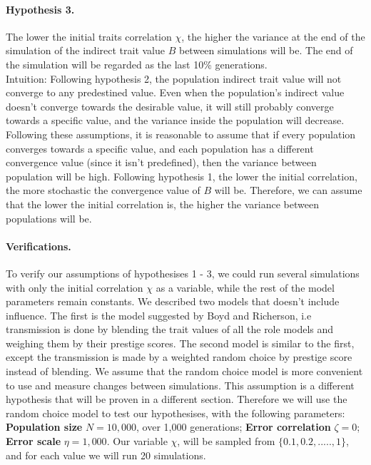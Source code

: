 \documentclass[11pt]{article}
\begin{document}
\paragraph{Hypothesis 3.} The lower the initial traits correlation $\chi$, the higher the variance at the end of the simulation of the indirect trait value $B$ between simulations will be.
The end of the simulation will be regarded as the last 10\% generations. \\
Intuition: Following hypothesis 2, the population indirect trait value will not converge to any predestined value.
Even when the population's indirect value doesn't converge towards the desirable value, it will still probably converge towards a specific value, and the variance inside the population will decrease.
Following these assumptions, it is reasonable to assume that if every population converges towards a specific value, and each population has a different convergence value (since it isn't predefined), then the variance between population will be high.
Following hypothesis 1, the lower the initial correlation, the more stochastic the convergence value of $B$ will be.
Therefore, we can assume that the lower the initial correlation is, the higher the variance between populations will be.

\paragraph{Verifications.} To verify our assumptions of hypothesises 1 - 3, we could run several simulations with only the initial correlation $\chi$ as a variable,
 while the rest of the model parameters remain constants.
 We described two models that doesn't include influence. The first is the model suggested by Boyd and Richerson, i.e transmission is done by blending the trait values of all the role models and weighing them by their prestige scores. The second model is similar to the first, except the transmission is made by a weighted random choice by prestige score instead of blending.
 We assume that the random choice model is more convenient to use and measure changes between simulations. This assumption is a different hypothesis that will be proven in a different section.
 Therefore we will use the random choice model to test our hypothesises, with the following parameters: \textbf{Population size} $N = 10,000$, over 1,000 generations; 
 \textbf{Error correlation} $\zeta = 0$; \textbf{Error scale} $\eta = 1,000$.
 Our variable $\chi$, will be sampled from $\{0.1,0.2,.....,1\}$, and for each value we will run 20 simulations. 
\end{document}
